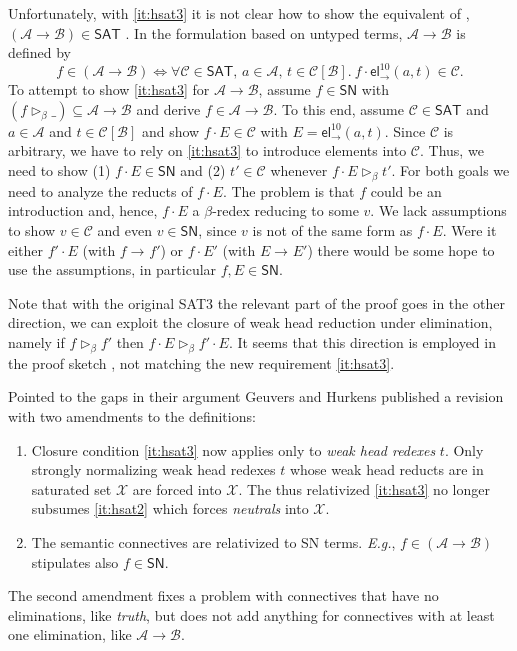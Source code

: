 \documentclass[a4paper,USenglish,cleveref, autoref, thm-restate]{lipics-v2021}
\newcommand{\Eg}{\emph{E.g.}\xspace}
\newcommand{\tel}{\mathsf{el}}
\newcommand{\el}[2]{\ensuremath{\tel_{#1}^{#2}}}
\newcommand{\whd}[1][]{\rhd_{#1}}
\newcommand{\red}[1][]{\longrightarrow_{#1}}
\newcommand{\A}{\mathcal{A}}
\newcommand{\B}{\mathcal{B}}
\newcommand{\C}{\mathcal{C}}
\newcommand{\X}{\mathcal{X}}
\newcommand{\SN}{\mathsf{SN}}
\newcommand{\SAT}{\mathsf{SAT}}
\begin{document}
Unfortunately, with \ref{it:hsat3} it is not clear how to show the equivalent of
, $(\A \to \B) \in \SAT$ \cite[Lemma~58]{geuversHurkens:types17}.
In the formulation based on untyped terms, $\A \to \B$ is defined by
\[
  f \in (\A \to \B)
  \iff
  \forall \C \in \SAT, \,
  a \in \A, \,
  t \in \C[\B].\
  f \cdot \el\to{10}(a,t) \in \C .
\]
To attempt to show \ref{it:hsat3} for $\A \to \B$, assume $f \in \SN$ with
$(f \whd[\beta]\_) \subseteq \A \to \B$ and derive $f \in \A \to \B$.
To this end, assume $\C \in \SAT$ and $a \in \A$ and $t \in \C[\B]$
and show $f \cdot E \in \C$ with $E = \el\to{10}(a,t)$.  Since $\C$ is
arbitrary, we have to rely on \ref{it:hsat3} to introduce elements into
$\C$.  Thus, we need to show (1) $f \cdot E \in \SN$ and (2)
$t' \in \C$ whenever $f \cdot E \whd[\beta] t'$.  For both goals we need to
analyze the reducts of $f \cdot E$.  The problem is that $f$ could be
an introduction and, hence, $f \cdot E$ a $\beta$-redex reducing to
some $v$.  We lack assumptions to show $v \in \C$ and even $v \in
\SN$, since $v$ is not of the same form as $f \cdot E$.  Were it either
$f' \cdot E$ (with $f \red f'$) or $f \cdot E'$ (with $E \red E'$)
there would be some hope to use the assumptions, in particular $f,E \in \SN$.

Note that with the original SAT3 the relevant part of the proof goes
in the other direction, we can exploit the closure of weak head
reduction under elimination, namely if $f \whd[\beta] f'$
then $f \cdot E \whd[\beta] f' \cdot E$.  It seems that this direction
is employed in the proof sketch
\cite[Lemma~58.c]{geuversHurkens:types17}, not matching the new
requirement \ref{it:hsat3}.

Pointed to the gaps in their argument Geuvers and Hurkens published a
revision \cite{geuversHurkens:addendumTypes17} with two amendments to
the definitions:
\begin{enumerate}
\item Closure condition \ref{it:hsat3} now applies only to \emph{weak
    head redexes} $t$.  Only strongly normalizing weak head redexes
  $t$ whose weak head reducts are in saturated set $\X$ are forced
  into $\X$.  The thus relativized \ref{it:hsat3} no longer subsumes
  \ref{it:hsat2} which forces \emph{neutrals} into $\X$.
\item The semantic connectives are relativized to SN terms.  \Eg, $f
  \in (\A \to \B)$ stipulates also $f \in \SN$.
\end{enumerate}
The second amendment fixes a problem with connectives that have no
eliminations, like \emph{truth}, but does not add anything for
connectives with at least one elimination, like $\A \to \B$.
\end{document}
